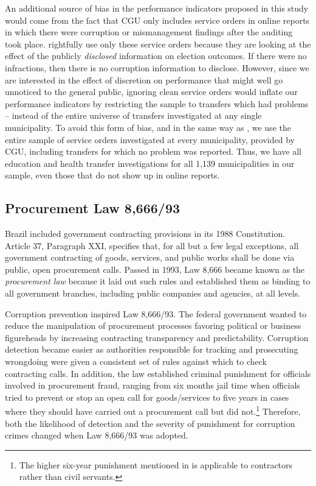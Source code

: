 \documentclass[11pt]{article}
\begin{document}


An additional source of bias in the performance indicators proposed in this study would come from the fact that CGU only includes service orders in online reports in which there were corruption or mismanagement findings after the auditing took place. \citet{FerrazExposingCorruptPoliticians2008b} rightfully use only these service orders because they are looking at the effect of the publicly \emph{disclosed} information on election outcomes. If there were no infractions, then there is no corruption information to disclose. However, since we are interested in the effect of discretion on performance that might well go unnoticed to the general public, ignoring clean service orders would inflate our performance indicators by restricting the sample to transfers which had problems -- instead of the entire universe of transfers investigated at any single municipality. To avoid this form of bias, and in the same way as \citet{FerrazElectoralAccountabilityCorruption2011a}, we use the entire sample of service orders investigated at every municipality, provided by CGU, including transfers for which no problem was reported. Thus, we have all education and health transfer investigations for all 1,139 municipalities in our sample, even those that do not show up in online reports.

\subsection{Procurement Law 8,666/93} \label{subsec:law866693}

Brazil included government contracting provisions in its 1988 Constitution. Article 37, Paragraph XXI, specifies that, for all but a few legal exceptions, all government contracting of goods, services, and public works shall be done via public, open procurement calls. Passed in 1993, Law 8,666 became known as the \emph{procurement law} because it laid out such rules and established them as binding to all government branches, including public companies and agencies, at all levels.

Corruption prevention inspired Law 8,666/93. The federal government wanted to reduce the manipulation of procurement processes favoring political or business figureheads by increasing contracting transparency and predictability. Corruption detection became easier as authorities responsible for tracking and prosecuting wrongdoing were given a consistent set of rules against which to check contracting calls. In addition, the law established criminal punishment for officials involved in procurement fraud, ranging from six months jail time when officials tried to prevent or stop an open call for goods/services to five years in cases where they should have carried out a procurement call but did not.\footnote{The higher six-year punishment mentioned in \citet{ZamboniAuditRiskRent2018} is applicable to contractors rather than civil servants.} Therefore, both the likelihood of detection and the severity of punishment for corruption crimes changed when Law 8,666/93 was adopted.
\end{document}
